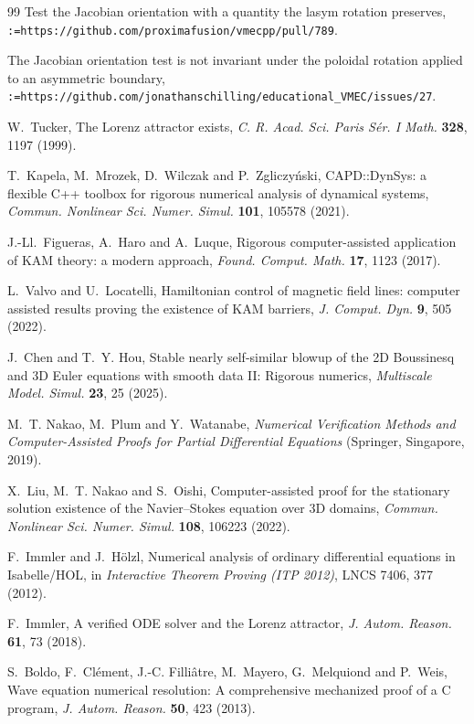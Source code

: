 \documentclass[11pt]{article}
\makeatletter
\def\sq@slash{/}
\newcommand{\link}[1]{\texttt{\@tfor\sq@t:=#1\do{\sq@t\ifx\sq@t\sq@slash\allowbreak\fi}}}
\makeatother
\begin{document}
\begin{thebibliography}{99}
Test the Jacobian orientation with a quantity the lasym rotation preserves,
\link{https://github.com/proximafusion/vmecpp/pull/789}.

The Jacobian orientation test is not invariant under the poloidal rotation
applied to an asymmetric boundary,
\link{https://github.com/jonathanschilling/educational\_VMEC/issues/27}.

W.~Tucker, The Lorenz attractor exists, \emph{C. R. Acad. Sci. Paris S\'er. I
Math.} \textbf{328}, 1197 (1999).

T.~Kapela, M.~Mrozek, D.~Wilczak and P.~Zgliczy\'nski, CAPD::DynSys: a flexible
C++ toolbox for rigorous numerical analysis of dynamical systems,
\emph{Commun. Nonlinear Sci. Numer. Simul.} \textbf{101}, 105578 (2021).

J.-Ll.~Figueras, A.~Haro and A.~Luque, Rigorous computer-assisted application
of KAM theory: a modern approach, \emph{Found. Comput. Math.} \textbf{17}, 1123
(2017).

L.~Valvo and U.~Locatelli, Hamiltonian control of magnetic field lines:
computer assisted results proving the existence of KAM barriers, \emph{J.
Comput. Dyn.} \textbf{9}, 505 (2022).

J.~Chen and T.~Y. Hou, Stable nearly self-similar blowup of the 2D Boussinesq
and 3D Euler equations with smooth data II: Rigorous numerics, \emph{Multiscale
Model. Simul.} \textbf{23}, 25 (2025).

M.~T. Nakao, M.~Plum and Y.~Watanabe, \emph{Numerical Verification Methods and
Computer-Assisted Proofs for Partial Differential Equations} (Springer,
Singapore, 2019).

X.~Liu, M.~T. Nakao and S.~Oishi, Computer-assisted proof for the stationary
solution existence of the Navier--Stokes equation over 3D domains, \emph{Commun.
Nonlinear Sci. Numer. Simul.} \textbf{108}, 106223 (2022).

F.~Immler and J.~H\"olzl, Numerical analysis of ordinary differential equations
in Isabelle/HOL, in \emph{Interactive Theorem Proving (ITP 2012)}, LNCS 7406,
377 (2012).

F.~Immler, A verified ODE solver and the Lorenz attractor, \emph{J. Autom.
Reason.} \textbf{61}, 73 (2018).

S.~Boldo, F.~Cl\'ement, J.-C. Filli\^atre, M.~Mayero, G.~Melquiond and P.~Weis,
Wave equation numerical resolution: A comprehensive mechanized proof of a C
program, \emph{J. Autom. Reason.} \textbf{50}, 423 (2013).


\end{thebibliography}
\end{document}
